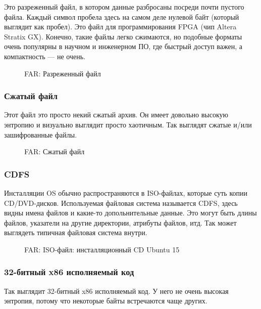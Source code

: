 Это разреженный файл, в котором данные разбросаны посреди почти пустого файла.
Каждый символ пробела здесь на самом деле нулевой байт (который выглядит как пробел).
Это файл для программирования FPGA (чип Altera Stratix GX).
Конечно, такие файлы легко сжимаются, но подобные форматы очень популярны в научном и инженерном ПО, где быстрый доступ важен, а компактность --- не очень.

\begin{figure}[H]
\centering
{}
\caption{FAR: Разреженный файл}
\end{figure}

\clearpage
\subsubsection{Сжатый файл}

Этот файл это просто некий сжатый архив.
Он имеет довольно высокую энтропию и визуально выглядит просто хаотичным.
Так выглядят сжатые и/или зашифрованные файлы.

\begin{figure}[H]
\centering
{}
\caption{FAR: Сжатый файл}
\end{figure}

\clearpage
\subsubsection{\ac{CDFS}}

Инсталляции \ac{OS} обычно распространяются в ISO-файлах, которые суть копии CD/DVD-дисков.
Используемая файловая система называется \ac{CDFS}, здесь видны имена файлов и какие-то допольнительные данные.
Это могут быть длины файлов, указатели на другие директории, атрибуты файлов, итд.
Так может выглядеть типичная файловая система внутри.

\begin{figure}[H]
\centering
{}
\caption{FAR: ISO-файл: инсталляционный \ac{CD} Ubuntu 15}
\end{figure}

\clearpage
\subsubsection{32-битный x86 исполняемый код}

Так выглядит 32-битный x86 исполняемый код.
У него не очень высокая энтропия, потому что некоторые байты встречаются чаще других.


